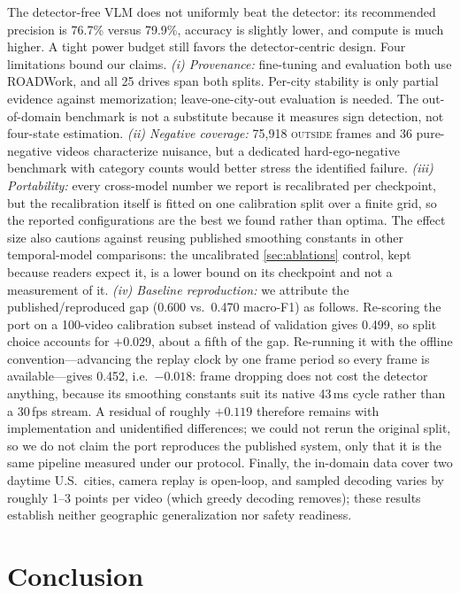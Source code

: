 \documentclass[10pt,twocolumn,letterpaper]{article}
\begin{document}
The detector-free VLM does not uniformly beat the detector: its recommended precision is 76.7\% versus 79.9\%, accuracy is slightly lower, and compute is much higher.  A tight power budget still favors the detector-centric design.  Four limitations bound our claims.  \emph{(i) Provenance:} fine-tuning and evaluation both use ROADWork, and all 25 drives span both splits.  Per-city stability is only partial evidence against memorization; leave-one-city-out evaluation is needed.  The out-of-domain benchmark is not a substitute because it measures sign detection, not four-state estimation.  \emph{(ii) Negative coverage:} 75{,}918 \textsc{outside} frames and 36 pure-negative videos characterize nuisance, but a dedicated hard-ego-negative benchmark with category counts would better stress the identified failure.  \emph{(iii) Portability:} every cross-model number we report is recalibrated per checkpoint, but the recalibration itself is fitted on one calibration split over a finite grid, so the reported configurations are the best we found rather than optima.  The effect size also cautions against reusing published smoothing constants in other temporal-model comparisons: the uncalibrated \cref{sec:ablations} control, kept because readers expect it, is a lower bound on its checkpoint and not a measurement of it.  \emph{(iv) Baseline reproduction:} we attribute the published/reproduced gap (0.600 vs.\ 0.470 macro-F1) as follows.  Re-scoring the port on a 100-video calibration subset instead of validation gives 0.499, so split choice accounts for $+0.029$, about a fifth of the gap.  Re-running it with the offline convention---advancing the replay clock by one frame period so every frame is available---gives 0.452, i.e.\ $-0.018$: frame dropping does not cost the detector anything, because its smoothing constants suit its native 43\,ms cycle rather than a 30\,fps stream.  A residual of roughly $+0.119$ therefore remains with implementation and unidentified differences; we could not rerun the original split, so we do not claim the port reproduces the published system, only that it is the same pipeline measured under our protocol.  Finally, the in-domain data cover two daytime U.S.\ cities, camera replay is open-loop, and sampled decoding varies by roughly 1--3 points per video (which greedy decoding removes); these results establish neither geographic generalization nor safety readiness.

\section{Conclusion}
\label{sec:conclusion}
\end{document}

